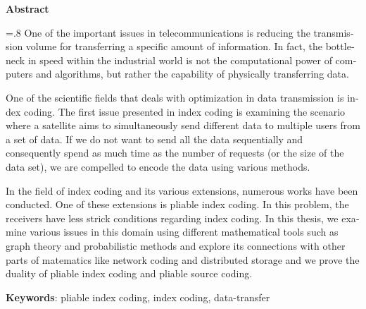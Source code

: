 


\pagestyle{empty}

\begin{latin}

\begin{center}
\textbf{Abstract}
\end{center}
\baselineskip=.8\baselineskip
One of the important issues in telecommunications is reducing the transmission volume for transferring a specific amount of information. In fact, the bottleneck in speed within the industrial world is not the computational power of computers and algorithms, but rather the capability of physically transferring data.

One of the scientific fields that deals with optimization in data transmission is index coding. The first issue presented in index coding is examining the scenario where a satellite aims to simultaneously send different data to multiple users from a set of data. If we do not want to send all the data sequentially and consequently spend as much time as the number of requests (or the size of the data set), we are compelled to encode the data using various methods.

In the field of index coding and its various extensions, numerous works have been conducted. One of these extensions is pliable index coding. In this problem, the receivers have less strick conditions regarding index coding. In this thesis, we examine various issues in this domain using different mathematical tools such as graph theory and probabilistic methods and explore its connections with other parts of matematics like network coding and distributed storage and we prove the duality of pliable index coding and pliable source coding.

\bigskip\noindent\textbf{Keywords}:
pliable index coding, index coding, data-transfer 

\end{latin}
